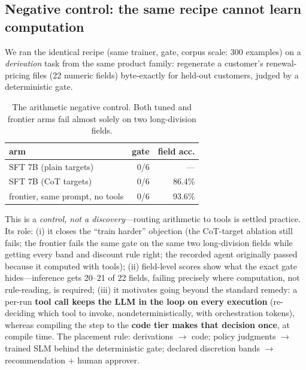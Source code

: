 \documentclass[11pt]{article}
\begin{document}
\subsection{Negative control: the same recipe cannot learn computation}\label{sec:control}
We ran the identical recipe (same trainer, gate, corpus scale: 300 examples) on a \emph{derivation} task from the same product family: regenerate a customer's renewal-pricing files (22 numeric fields) byte-exactly for held-out customers, judged by a deterministic gate.

\begin{table}[t]\small
  \centering
  \begin{tabular}{@{}lrr@{}}
    \toprule
    arm & gate & field acc. \\
    \midrule
    SFT 7B (plain targets)     & 0/6 & --- \\
    SFT 7B (CoT targets)       & 0/6 & 86.4\% \\
    frontier, same prompt, no tools & 0/6 & 93.6\% \\
    \bottomrule
  \end{tabular}
  \caption{The arithmetic negative control. Both tuned and frontier arms fail almost solely on two long-division fields.}
  \label{tab:control}
\end{table}

This is a \emph{control, not a discovery}---routing arithmetic to tools is settled practice. Its role: (i) it closes the ``train harder'' objection (the CoT-target ablation still fails; the frontier fails the same gate on the same two long-division fields while getting every band and discount rule right; the recorded agent originally passed because it computed with tools); (ii) field-level scores show what the exact gate hides---inference gets 20--21 of 22 fields, failing precisely where computation, not rule-reading, is required; (iii) it motivates going beyond the standard remedy: a per-run \textbf{tool call keeps the LLM in the loop on every execution} (re-deciding which tool to invoke, nondeterministically, with orchestration tokens), whereas compiling the step to the \textbf{code tier makes that decision once}, at compile time. The placement rule: derivations $\rightarrow$ code; policy judgments $\rightarrow$ trained SLM behind the deterministic gate; declared discretion bands $\rightarrow$ recommendation + human approver.
\end{document}
